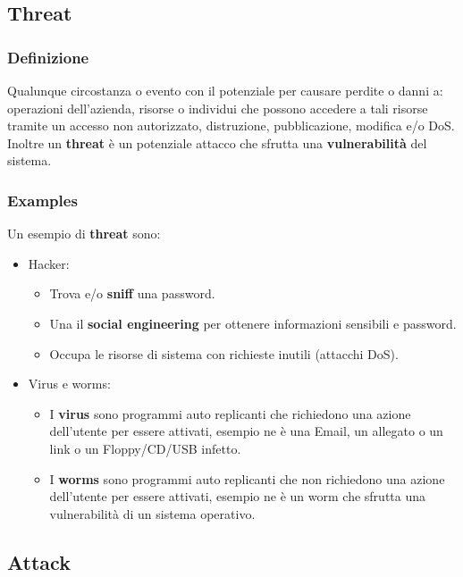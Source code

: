     \subsection{Threat}
        \subsubsection{Definizione}
            Qualunque circostanza o evento con il potenziale per causare perdite o danni a: operazioni dell'azienda, risorse o individui che possono accedere a tali risorse tramite un accesso non autorizzato, distruzione, pubblicazione, modifica e/o DoS. Inoltre un \textbf{threat} è un potenziale attacco che sfrutta una \textbf{vulnerabilità} del sistema.
        \subsubsection{Examples}
                Un esempio di \textbf{threat} sono:
                \begin{itemize}
                    \item Hacker:
                        \begin{itemize}
                            \item Trova e/o \textbf{sniff} una password.
                            \item Una il \textbf{social engineering} per ottenere informazioni sensibili e password.
                            \item Occupa le risorse di sistema con richieste inutili (attacchi DoS).
                        \end{itemize}
                    \item Virus e worms:
                        \begin{itemize}
                            \item I \textbf{virus} sono programmi auto replicanti che richiedono una azione dell'utente per essere attivati, esempio ne è una Email, un allegato o un link o un Floppy/CD/USB infetto.
                            \item I \textbf{worms} sono programmi auto replicanti che non richiedono una azione dell'utente per essere attivati, esempio ne è un worm che sfrutta una vulnerabilità di un sistema operativo.
                        \end{itemize} 
                \end{itemize}
    \subsection{Attack}
